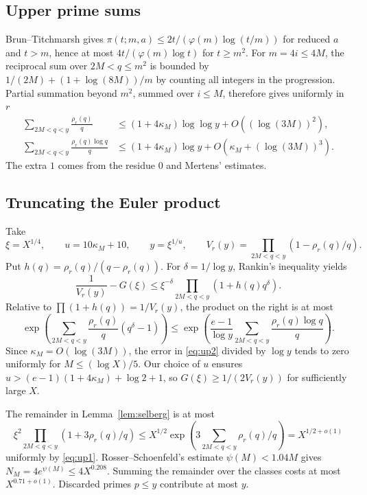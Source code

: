 \documentclass[11pt,a4paper]{amsart}
\theoremstyle{definition}\newtheorem{definition}[theorem]{Definition}
\begin{document}
\subsection{Upper prime sums}
Brun--Titchmarsh gives
$\pi(t;m,a)\le2t/(\varphi(m)\log(t/m))$ for reduced $a$ and $t>m$,
hence at most $4t/(\varphi(m)\log t)$ for $t\ge m^2$.
For $m=4i\le4M$, the reciprocal sum over $2M<q\le m^2$
is bounded by
$1/(2M)+(1+\log(8M))/m$ by counting all integers in the progression.
Partial summation beyond $m^2$, summed over $i\le M$,
therefore gives uniformly in $r$
\begin{align}
 \sum_{2M<q<y}\frac{\rho_r(q)}q
 &\le(1+4\kappa_M)\log\log y+O((\log(3M))^2),\label{eq:up1}\\
 \sum_{2M<q<y}\frac{\rho_r(q)\log q}q
 &\le(1+4\kappa_M)\log y+
                     O(\kappa_M+(\log(3M))^3).\label{eq:up2}
\end{align}
The extra $1$ comes from the residue $0$ and Mertens' estimates.

\subsection{Truncating the Euler product}
Take
\[
 \xi=X^{1/4},\qquad u=10\kappa_M+10,\qquad
 y=\xi^{1/u},\qquad
 V_r(y)=\prod_{2M<q<y}(1-\rho_r(q)/q).
\]
Put $h(q)=\rho_r(q)/(q-\rho_r(q))$. For $\delta=1/\log y$,
Rankin's inequality yields
\[
 \frac1{V_r(y)}-G(\xi)
 \le \xi^{-\delta}\prod_{2M<q<y}(1+h(q)q^\delta).
\]
Relative to $\prod(1+h(q))=1/V_r(y)$, the product on the
right is at most
\[
 \exp\left(\sum_{2M<q<y}\frac{\rho_r(q)}q(q^\delta-1)\right)
 \le \exp\left(\frac{e-1}{\log y}
              \sum_{2M<q<y}\frac{\rho_r(q)\log q}q\right).
\]
Since $\kappa_M=O(\log(3M))$, the error in
\eqref{eq:up2} divided by $\log y$ tends to zero uniformly
for $M\le(\log X)/5$. Our choice of $u$ ensures
$u>(e-1)(1+4\kappa_M)+\log2+1$, so
$G(\xi)\ge1/(2V_r(y))$ for sufficiently large $X$.

The remainder in Lemma~\ref{lem:selberg} is at most
\[
 \xi^2\prod_{2M<q<y}(1+3\rho_r(q)/q)
 \le X^{1/2}\exp\left(3\sum_{2M<q<y}\rho_r(q)/q\right)
 =X^{1/2+o(1)}
\]
uniformly by \eqref{eq:up1}. Rosser--Schoenfeld's estimate
$\psi(M)<1.04M$ \cite[Theorem~12]{RS} gives
$N_M=4e^{\psi(M)}\le4X^{0.208}$.
Summing the remainder over the classes costs at most
$X^{0.71+o(1)}$. Discarded primes $p\le y$ contribute at most $y$.
\end{document}

